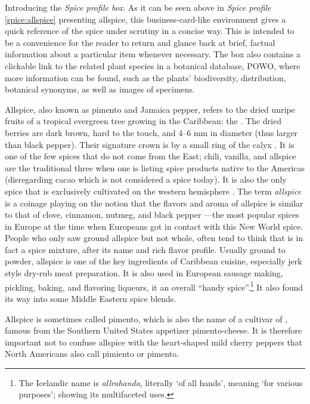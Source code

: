 \begin{note}
	Introducing the \textit{Spice profile box}. As it can be seen above in \textit{Spice profile} \ref{spice:allspice} presenting allspice, this business-card-like environment gives a quick reference of the spice under scrutiny in a concise way. This is intended to be a convenience for the reader to return and glance back at brief, factual information about a particular item whenever necessary. The box also contains a clickable link to the related plant species in a botanical database, \gls{POWO}, where more information can be found, such as the plants' biodiversity, distribution, botanical synonyms, as well as images of specimens.
\end{note}

Allspice, also known as pimento and Jamaica pepper, refers to the dried unripe fruits of a tropical evergreen tree growing in the Caribbean: the . The dried berries are dark brown, hard to the touch, and 4--6 mm in diameter (thus larger than black pepper). Their signature crown is by a small ring of the calyx \autocite[210]{van_wyk_culinary_2014}. It is one of the few spices that do not come from the East; chili, vanilla, and allspice are the traditional three when one is listing spice products native to the Americas (disregarding cacao which is not considered a spice today). It is also the only spice that is exclusively cultivated on the western hemisphere \autocite[21]{duke_crc_2002}. The term \textit{allspice} is a coinage playing on the notion that the flavors and aroma of allspice is similar to that of clove, cinnamon, nutmeg, and black pepper \autocite[717]{mabberley_mabberleys_2017}---the most popular spices in Europe at the time when Europeans got in contact with this New World spice. People who only saw ground allspice but not whole, often tend to think that is in fact a spice mixture, after its name and rich flavor profile. Usually ground to powder, allspice is one of the key ingredients of Caribbean cuisine, especially jerk style dry-rub meat preparation. It is also used in European sausage making, pickling, baking, and flavoring liqueurs, it an overall ``handy spice''.\footnote{The Icelandic name is \textit{allrahanda}, literally `of all hands', meaning `for various purposes'; showing its multifaceted uses.} It also found its way into some Middle Eastern spice blends.


\begin{note}
\label{note:pimento}
Allspice is sometimes called pimento, which is also the name of a cultivar of , famous from the Southern United States appetizer pimento-cheese. It is therefore important not to confuse allspice with the heart-shaped mild cherry peppers that North Americans also call pimiento or pimento. 
\end{note}

